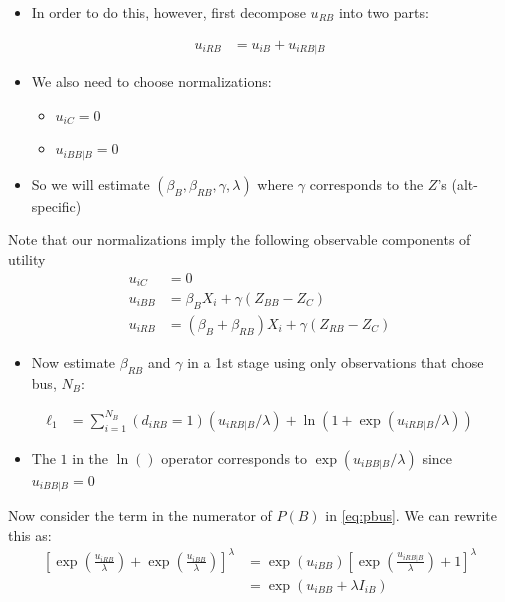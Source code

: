 \documentclass[11pt]{article}
\begin{document}
\begin{itemize}
\item In order to do this, however, first decompose \(u_{RB}\) into two parts:
\end{itemize}
\begin{align*}
u_{iRB}&=u_{iB}+u_{iRB|B}
\end{align*}
\begin{itemize}
\item We also need to choose normalizations:

\begin{itemize}
\item \(u_{iC} = 0\)
\item \(u_{iBB|B} = 0\)
\end{itemize}

\item So we will estimate \((\beta_{B},\beta_{RB}, \gamma,\lambda)\) where \(\gamma\) corresponds to the \(Z\)'s (alt-specific)
\end{itemize}

Note that our normalizations imply the following observable components of utility
\begin{align*}
u_{iC}&=0\\
u_{iBB}&=\beta_{B}X_{i}+\gamma (Z_{BB}-Z_{C})\\
u_{iRB}&=(\beta_{B}+\beta_{RB})X_{i}+\gamma (Z_{RB}-Z_{C})
\end{align*}

\begin{itemize}
\item Now estimate \(\beta_{RB}\) and \(\gamma\) in a 1st stage using only observations that chose bus, \(N_B\):
\end{itemize}
\begin{align*}
\ell_1&=\sum_{i=1}^{N_B}(d_{iRB}=1)(u_{iRB|B}/\lambda)+\ln\left(1+\exp(u_{iRB|B}/\lambda)\right)
\end{align*}

\begin{itemize}
\item The \(1\) in the \(\ln()\) operator corresponds to \(\exp(u_{iBB|B}/\lambda)\) since \(u_{iBB|B} = 0\)
\end{itemize}


Now consider the term in the numerator of \(P(B)\) in \eqref{eq:pbus}.  We can rewrite this as:
\begin{align*}
\left[\exp\left(\frac{u_{iRB}}{\lambda}\right)+\exp\left(\frac{u_{iBB}}{\lambda}\right)\right]^{\lambda}&=
\exp(u_{iBB})\left[\exp\left(\frac{u_{iRB|B}}{\lambda}\right)+1\right]^{\lambda}\\
&=\exp(u_{iBB}+\lambda I_{iB})
\end{align*}
\end{document}
